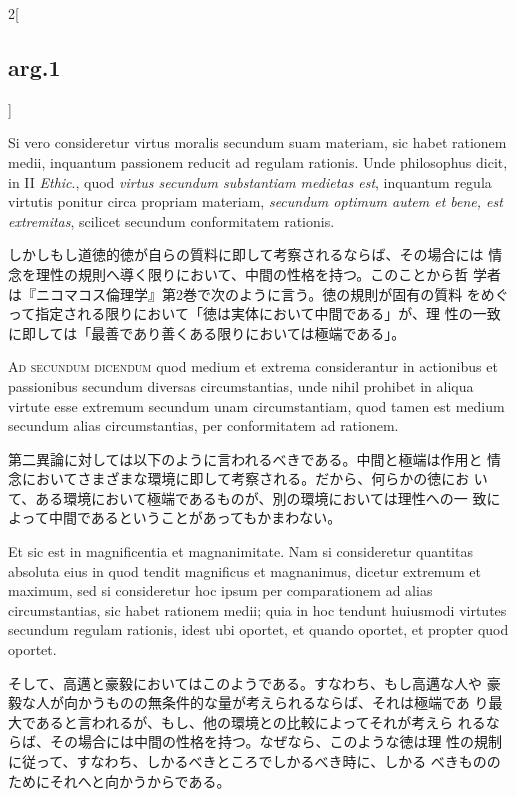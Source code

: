\documentclass[paper=a4paper,fontsize=10pt,jafontsize=9pt,titlepage]{jlreq}
\begin{document}
\begin{paracol}{2}[\subsection{arg.1}]
\switchcolumn*

Si vero consideretur virtus moralis secundum suam materiam, sic habet
rationem medii, inquantum passionem reducit ad regulam rationis. Unde
philosophus dicit, in II {\itshape Ethic}., quod {\itshape virtus
secundum substantiam medietas est}, inquantum regula virtutis ponitur
circa propriam materiam, {\itshape secundum optimum autem et bene, est
extremitas}, scilicet secundum conformitatem rationis.

\switchcolumn

しかしもし道徳的徳が自らの質料に即して考察されるならば、その場合には
 情念を理性の規則へ導く限りにおいて、中間の性格を持つ。このことから哲
 学者は『ニコマコス倫理学』第2巻で次のように言う。徳の規則が固有の質料
 をめぐって指定される限りにおいて「徳は実体において中間である」が、理
 性の一致に即しては「最善であり善くある限りにおいては極端である」。

\switchcolumn*[\subsection{ad.2}]

{\scshape Ad secundum dicendum} quod medium et extrema considerantur
in actionibus et passionibus secundum diversas circumstantias, unde
nihil prohibet in aliqua virtute esse extremum secundum unam
circumstantiam, quod tamen est medium secundum alias circumstantias,
per conformitatem ad rationem.

\switchcolumn

第二異論に対しては以下のように言われるべきである。中間と極端は作用と
 情念においてさまざまな環境に即して考察される。だから、何らかの徳にお
 いて、ある環境において極端であるものが、別の環境においては理性への一
 致によって中間であるということがあってもかまわない。

\switchcolumn*

Et sic est in magnificentia et magnanimitate. Nam si consideretur
quantitas absoluta eius in quod tendit magnificus et magnanimus,
dicetur extremum et maximum, sed si consideretur hoc ipsum per
comparationem ad alias circumstantias, sic habet rationem medii; quia
in hoc tendunt huiusmodi virtutes secundum regulam rationis, idest ubi
oportet, et quando oportet, et propter quod oportet.

\switchcolumn

そして、高邁と豪毅においてはこのようである。すなわち、もし高邁な人や
 豪毅な人が向かうものの無条件的な量が考えられるならば、それは極端であ
 り最大であると言われるが、もし、他の環境との比較によってそれが考えら
 れるならば、その場合には中間の性格を持つ。なぜなら、このような徳は理
 性の規制に従って、すなわち、しかるべきところでしかるべき時に、しかる
 べきもののためにそれへと向かうからである。


\end{paracol}
\end{document}
